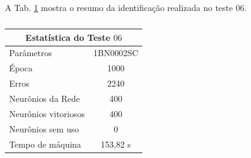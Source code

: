 A Tab. \ref{Estatistica do teste $06$} mostra o resumo da identificação realizada no teste $06$.

\begin{table}[H]
	\centering
	\caption{}
	\label{Estatistica do teste $06$}
	\begin{tabular}{@{}lc@{}}
		\toprule
		\multicolumn{2}{c}{Estatística do Teste $06$}         \\ \midrule
		Parâmetros                  & 1BN0002SC \\
		Época                       & 1000       \\
		Erros                       & 2240       \\
		Neurônios da Rede           & 400       \\
		Neurônios vitoriosos        & 400       \\
		Neurônios sem uso           & 0         \\
		Tempo de máquina            & 153,82 s   \\ \bottomrule
	\end{tabular}
\end{table} 

